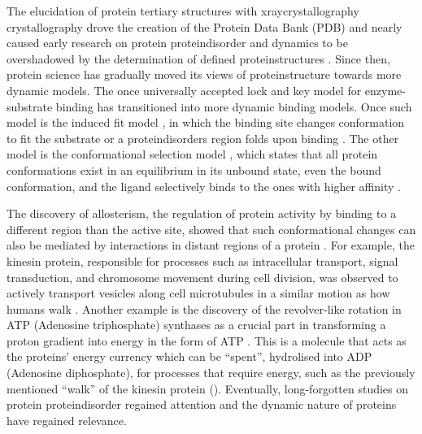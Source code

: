 The elucidation of protein tertiary structures with \gls{xraycrystallography} crystallography drove the creation of the Protein Data Bank (PDB) \cite{berman_protein_2012} and nearly caused early research on protein \gls{proteindisorder} and \gls{dynamics} \cite{pauling_theory_1940, jirgensons_classification_1966} to be overshadowed by the determination of defined \glspl{proteinstructure} \cite{bondos_roles_2021}. Since then, protein science has gradually moved its views of \gls{proteinstructure} towards more dynamic models. The once universally accepted lock and key model for enzyme-substrate binding \cite{fischer_einfluss_1894} has transitioned into more dynamic binding models. Once such model is the induced fit model \cite{koshland_application_1958, vasella_glycosidase_2002}, in which the binding site changes \gls{conformation} to fit the substrate or a \glspl{proteindisorder} region folds upon binding \cite{tsai_folding_1999, bonetti_analyzing_2017, delaforge_deciphering_2018, bonetti_how_2018, fuxreiter_fold_2019, robustelli_mechanism_2020}. The other model is the conformational selection model \cite{tsai_structured_2001}, which states that all protein \glspl{conformation} exist in an equilibrium in its unbound state, even the bound \gls{conformation}, and the \gls{ligand} selectively binds to the ones with higher affinity \cite{vogt_conformational_2013, vogt_essential_2014}. 

The discovery of allosterism, the regulation of protein activity by binding to a different region than the active site, showed that such conformational changes can also be mediated by interactions in distant regions of a protein \cite{monod_general_1961, monod_nature_1965}. For example, the kinesin protein, responsible for processes such as intracellular transport, signal transduction, and chromosome movement during cell division, was observed to actively transport vesicles along cell microtubules in a similar motion as how humans walk \cite{vale_molecular_2003, endow_kinesins_2010}. Another example is the discovery of the revolver-like rotation in ATP (Adenosine triphosphate) synthases as a crucial part in transforming a \gls{proton} gradient into energy in the form of ATP \cite{noji_direct_1997}. This is a molecule that acts as the proteins' energy currency which can be ``spent'', hydrolised into ADP (Adenosine diphosphate), for processes that require energy, such as the previously mentioned ``walk'' of the kinesin protein (). Eventually, long-forgotten studies on protein \gls{proteindisorder} regained attention and the dynamic nature of proteins have regained relevance.

